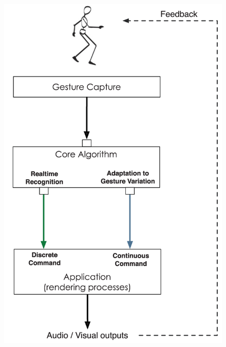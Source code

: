 \documentclass{beamer}
\begin{document}
\begin{frame}
\begin{columns}
\begin{column}{.4\textwidth}
\begin{figure}
\includegraphics[width=\linewidth]{../Bilder/Fig1}
\label{fig:Fig1}
\end{figure}
\end{column}
\end{columns}
\end{frame}
\end{document}
